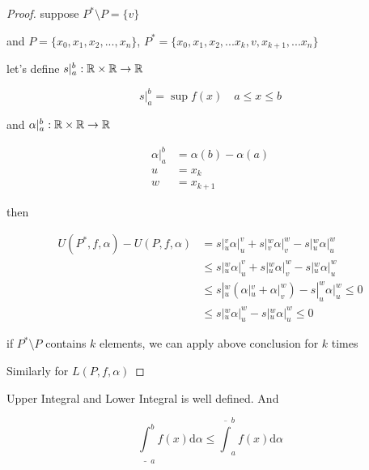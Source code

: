 \begin{proof}
   suppose $P^* \setminus P  = \{ v \}$ 

   and $P = \{ x_0, x_1,x_2,...,x_n \}$, $P^* = \{ x_0, x_1,x_2,...x_k,v,x_{k+1},...x_n \}$

   let's define $s|_a^b: \mathbb{R} \times \mathbb{R} \to \mathbb{R}$

   \[
        s|_{a}^{b} = \sup f(x) \quad  a \le x \le b
   \]

   and $\alpha|_a^b: \mathbb{R} \times \mathbb{R} \to \mathbb{R}$

   \begin{align*}
    \alpha|_{a}^{b} &= \alpha(b) - \alpha(a) \\
    u &= x_k \\
    w &=  x_{k+1}
   \end{align*}

   then 

   \begin{align*}
    U(P^*,f, \alpha) - U(P,f, \alpha) &= s|_{u}^{v}\alpha|_{u}^{v} + s|_{v}^{w}\alpha|_{v}^{w} - s|_{u}^{w}\alpha|_{u}^{w}\\
    & \le s|_{u}^{w}\alpha|_{u}^{v} + s|_{u}^{w}\alpha|_{v}^{w} - s|_{u}^{w}\alpha|_{u}^{w} \\
    & \le s|_{u}^{w}\left(\alpha|_{u}^{v} + \alpha|_{v}^{w}\right) - s|_{u}^{w}\alpha|_{u}^{w} \le 0 \\
    & \le s|_{u}^{w}\alpha|_{u}^{w} - s|_{u}^{w}\alpha|_{u}^{w} \le 0
   \end{align*}

   if $P^* \setminus P$ contains $k$ elements, we can apply above conclusion for $k$ times

   Similarly for $L(P,f, \alpha)$
\end{proof}

\begin{thm}
    Upper Integral and Lower Integral is well defined. And

    \[
        \underline{\int}_a^b f(x) \mathrm{d} \alpha  \le \overline{\int}_a^b f(x) \mathrm{d} \alpha
    \]
\end{thm}

